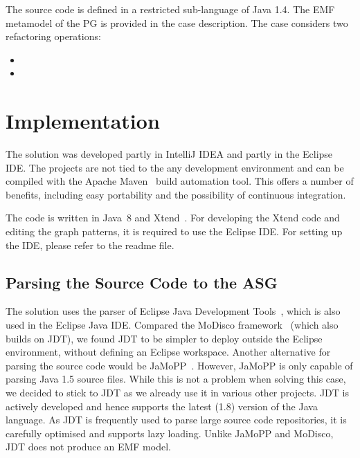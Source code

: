 \documentclass[submission,copyright,creativecommons]{eptcs}
\begin{document}
The source code is defined in a restricted sub-language of Java 1.4. The EMF metamodel of the PG is provided in the case description. The case considers two refactoring operations:

\begin{itemize}[noitemsep]
\item {}
\item {}
\end{itemize}

\section{Implementation}

The solution was developed partly in IntelliJ IDEA and partly in the Eclipse IDE. The projects are not tied to the any development environment and can be compiled with the Apache Maven~\cite{Maven} build automation tool. This offers a number of benefits, including easy portability and the possibility of continuous integration.

The code is written in Java~8 and Xtend~\cite{Xtend}. For developing the Xtend code and editing the graph patterns, it is required to use the Eclipse IDE. For setting up the IDE, please refer to the readme file. 

\subsection{Parsing the Source Code to the ASG}



The solution uses the parser of Eclipse Java Development Tools~\cite{jdt}, which is also used in the Eclipse Java IDE. Compared the MoDisco framework~\cite{MoDisco} (which also builds on JDT), we found JDT to be simpler to deploy outside the Eclipse environment, \ie without defining an Eclipse workspace. Another alternative for parsing the source code would be JaMoPP~\cite{JaMoPP}. However, JaMoPP is only capable of parsing Java 1.5 source files. While this is not a problem when solving this case, we decided to stick to JDT as we already use it in various other projects. JDT is actively developed and hence supports the latest (1.8) version of the Java language. As JDT is frequently used to parse large source code repositories, it is carefully optimised and supports lazy loading. Unlike JaMoPP and MoDisco, JDT does not produce an EMF model.
\end{document}
